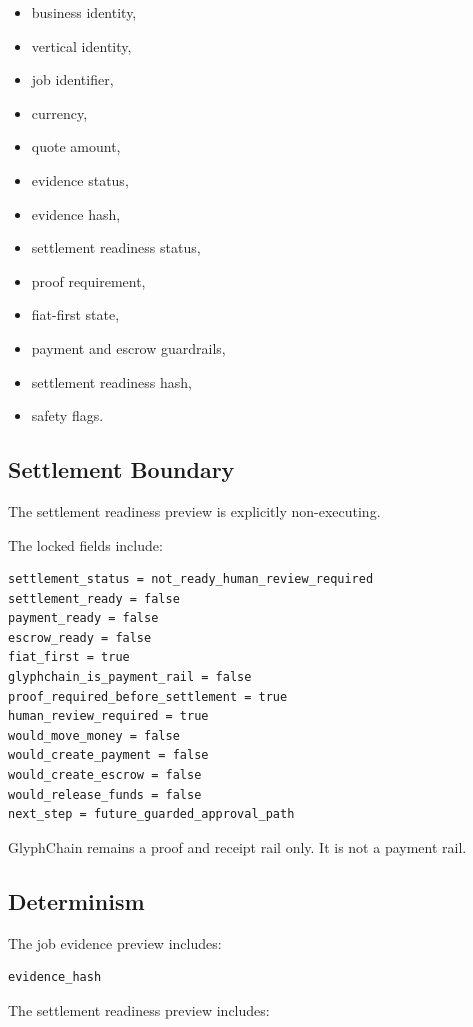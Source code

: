 \begin{itemize}
  \item business identity,
  \item vertical identity,
  \item job identifier,
  \item currency,
  \item quote amount,
  \item evidence status,
  \item evidence hash,
  \item settlement readiness status,
  \item proof requirement,
  \item fiat-first state,
  \item payment and escrow guardrails,
  \item settlement readiness hash,
  \item safety flags.
\end{itemize}

\subsection{Settlement Boundary}

The settlement readiness preview is explicitly non-executing.

The locked fields include:

\begin{verbatim}
settlement_status = not_ready_human_review_required
settlement_ready = false
payment_ready = false
escrow_ready = false
fiat_first = true
glyphchain_is_payment_rail = false
proof_required_before_settlement = true
human_review_required = true
would_move_money = false
would_create_payment = false
would_create_escrow = false
would_release_funds = false
next_step = future_guarded_approval_path
\end{verbatim}

GlyphChain remains a proof and receipt rail only. It is not a payment rail.

\subsection{Determinism}

The job evidence preview includes:

\begin{verbatim}
evidence_hash
\end{verbatim}

The settlement readiness preview includes:

